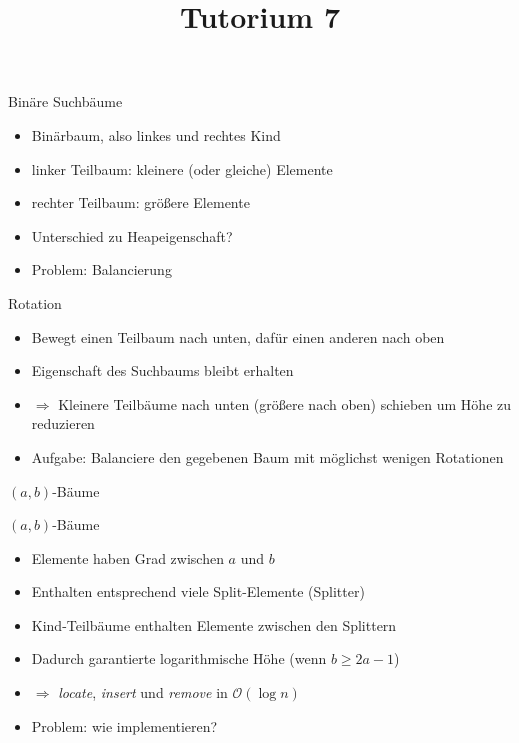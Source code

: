 
\title[Algorithmen I SS 14]{Tutorium 7}

\usepackage{alltt}





\begin{frame}
  \maketitle
\end{frame}

\begin{frame}{Binäre Suchbäume}
	\begin{itemize}
		\item Binärbaum, also linkes und rechtes Kind
		\item linker Teilbaum: kleinere (oder gleiche) Elemente
		\item rechter Teilbaum: größere Elemente
		\item Unterschied zu Heapeigenschaft?
		\item Problem: Balancierung
	\end{itemize}
\end{frame}

\begin{frame}{Rotation}
	\begin{itemize}
		\item Bewegt einen Teilbaum nach unten, dafür einen anderen nach oben
		\item Eigenschaft des Suchbaums bleibt erhalten
		\item $\Rightarrow$ Kleinere Teilbäume nach unten (größere nach oben) schieben um Höhe zu reduzieren
		\item Aufgabe: Balanciere den gegebenen Baum mit möglichst wenigen Rotationen
	\end{itemize}
\end{frame}

\begin{frame}
	\begin{center}
		\Huge
		$(a, b)$-Bäume
	\end{center}
\end{frame}

\begin{frame}{$(a, b)$-Bäume}
	\begin{itemize}
		\item Elemente haben Grad zwischen $a$ und $b$
		\item Enthalten entsprechend viele Split-Elemente (Splitter)
		\item Kind-Teilbäume enthalten Elemente zwischen den Splittern
		\item Dadurch garantierte logarithmische Höhe (wenn $b \geq 2 a - 1$)
		\item $\Rightarrow$ \emph{locate}, \emph{insert} und \emph{remove} in $\mathcal{O}(\log{n})$
		\item Problem: wie implementieren?
	\end{itemize}
\end{frame}

